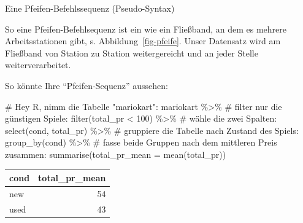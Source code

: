 \documentclass[
  letterpaper,
]{scrbook}
\newenvironment{Shaded}{\begin{snugshade}}{\end{snugshade}}
\newcommand{\AttributeTok}[1]{\textcolor[rgb]{0.40,0.45,0.13}{#1}}
\newcommand{\CommentTok}[1]{\textcolor[rgb]{0.37,0.37,0.37}{#1}}
\newcommand{\DecValTok}[1]{\textcolor[rgb]{0.68,0.00,0.00}{#1}}
\newcommand{\FunctionTok}[1]{\textcolor[rgb]{0.28,0.35,0.67}{#1}}
\newcommand{\NormalTok}[1]{\textcolor[rgb]{0.00,0.23,0.31}{#1}}
\newcommand{\SpecialCharTok}[1]{\textcolor[rgb]{0.37,0.37,0.37}{#1}}
\theoremstyle{definition}
\theoremstyle{definition}
\theoremstyle{definition}
\theoremstyle{remark}
\begin{document}
\begin{codelisting}

\caption{\label{lst-pfeife}Eine Pfeifen-Befehlssequenz (Pseudo-Syntax)}

\centering{

\begin{Shaded}
\begin{Highlighting}[]
\NormalTok{meine\_daten }\SpecialCharTok{\%\textgreater{}\%}
\NormalTok{  filter\_gewünschte}\FunctionTok{\_zeilen}\NormalTok{() }\SpecialCharTok{\%\textgreater{}\%}
\NormalTok{  wähle\_gewünschte}\FunctionTok{\_spalten}\NormalTok{() }\SpecialCharTok{\%\textgreater{}\%}
  \FunctionTok{gruppiere}\NormalTok{() }\SpecialCharTok{\%\textgreater{}\%}
  \FunctionTok{fasse\_zusammen}\NormalTok{() }
\end{Highlighting}
\end{Shaded}

}

\end{codelisting}%

So eine Pfeifen-Befehlsequenz ist ein wie ein Fließband, an dem es
mehrere Arbeitsstationen gibt, s. Abbildung~\ref{fig-pfeife}. Unser
Datensatz wird am Fließband von Station zu Station weitergereicht und an
jeder Stelle weiterverarbeitet.

So könnte Ihre ``Pfeifen-Sequenz'' aussehen:

\begin{Shaded}
\begin{Highlighting}[]
\CommentTok{\# Hey R, nimm die Tabelle "mariokart":}
\NormalTok{mariokart }\SpecialCharTok{\%\textgreater{}\%}  
   \CommentTok{\# filter nur die günstigen Spiele:}
  \FunctionTok{filter}\NormalTok{(total\_pr }\SpecialCharTok{\textless{}} \DecValTok{100}\NormalTok{) }\SpecialCharTok{\%\textgreater{}\%} 
  \CommentTok{\# wähle die zwei Spalten:}
  \FunctionTok{select}\NormalTok{(cond, total\_pr) }\SpecialCharTok{\%\textgreater{}\%}  
  \CommentTok{\# gruppiere die Tabelle nach Zustand des Spiels:}
  \FunctionTok{group\_by}\NormalTok{(cond) }\SpecialCharTok{\%\textgreater{}\%}  
  \CommentTok{\# fasse beide Gruppen nach dem mittleren Preis zusammen:}
  \FunctionTok{summarise}\NormalTok{(}\AttributeTok{total\_pr\_mean =} \FunctionTok{mean}\NormalTok{(total\_pr))  }
\end{Highlighting}
\end{Shaded}

\begin{longtable}[]{@{}lr@{}}
\toprule\noalign{}
cond & total\_pr\_mean \\
\midrule\noalign{}
\endhead
\bottomrule\noalign{}
\endlastfoot
new & 54 \\
used & 43 \\
\end{longtable}
\end{document}
